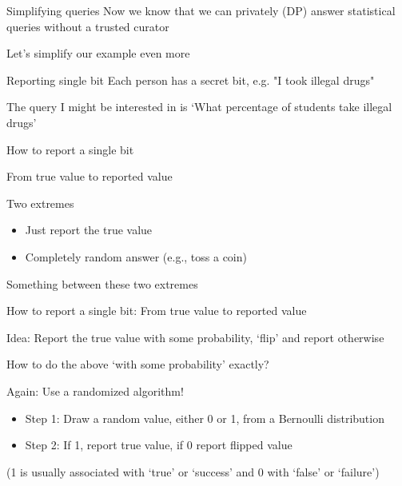 \documentclass[12pt,aspectratio=169,handout]{beamer}
\begin{document}
\begin{frame}{Simplifying queries}
Now we know that we can privately (DP) answer statistical queries without a trusted curator

Let's simplify our example even more

\end{frame}


\begin{frame}{Reporting single bit}
Each person has a secret bit, e.g. "I took illegal drugs"


The query I might be interested in is `What percentage of students take illegal drugs'

\end{frame}



\begin{frame}{How to report a single bit}

From true value to reported value

Two extremes

\pause

\begin{itemize}
\item Just report the true value
\item Completely random answer (e.g., toss a coin)
\end{itemize}

Something between these two extremes

\end{frame}




\begin{frame}{How to report a single bit: From true value to reported value}


Idea: Report the true value with some probability, `flip' and report otherwise

How to do the above `with some probability' exactly?

Again: Use a randomized algorithm!

\begin{itemize}
\item Step 1: Draw a random value, either 0 or 1, from a Bernoulli distribution
\item Step 2: If 1, report true value, if 0 report flipped value
\end{itemize}

(1 is usually associated with `true' or `success' and 0 with `false' or `failure')

\end{frame}
\end{document}
